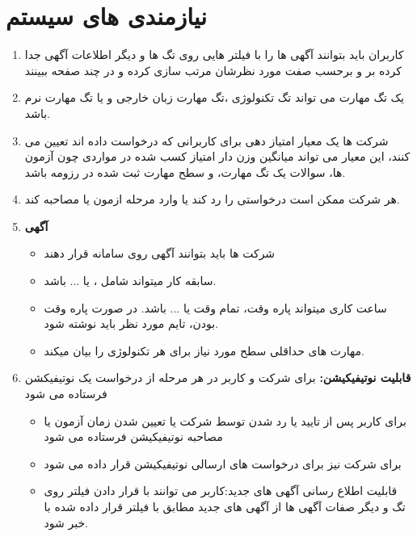 \documentclass{article}
\begin{document}
\section{نیازمندی های سیستم}
    \begin{enumerate}[\hspace{1cm}1.]
        \item کاربران باید بتوانند آگهی ها را با فیلتر هایی روی تگ ها و دیگر اطلاعات آگهی جدا کرده بر و برحسب صفت مورد نظرشان مرتب سازی کرده و در چند صفحه ببینند
        \item یک تگ مهارت می تواند تگ تکنولوژی ،تگ مهارت زبان خارجی و یا تگ مهارت نرم باشد.
        \item شرکت ها یک معیار امتیاز دهی برای کاربرانی که درخواست داده اند تعیین می کنند،
        این معیار می تواند میانگین وزن دار امتیاز کسب شده در مواردی چون آزمون ها، سوالات یک تگ مهارت، و سطح مهارت ثبت شده در رزومه باشد.
        \item هر شرکت ممکن است درخواستی را رد کند یا وارد مرحله ازمون یا مصاحبه کند.
        
        \item \textbf{آگهی}
        \begin{itemize}
            \item شرکت ها باید بتوانند آگهی روی سامانه قرار دهند 
            \item سابقه کار میتواند شامل ،  یا ... باشد.
            \item ساعت کاری میتواند پاره وقت، تمام وقت یا ... باشد. در صورت پاره وقت بودن، تایم مورد نظر باید نوشته شود.
            \item مهارت های حداقلی سطح مورد نیاز برای هر تکنولوژی را بیان میکند.
        \end{itemize}

        \item \textbf{ قابلیت نوتیفیکیشن:} برای شرکت و کاربر در هر مرحله از درخواست یک نوتیفیکشن فرستاده می شود
        \begin{itemize}
            \item برای کاربر پس از تایید یا رد شدن توسط شرکت یا تعیین شدن زمان آزمون یا مصاحبه نوتیفیکیشن فرستاده می شود
            \item برای شرکت نیز برای درخواست های ارسالی نوتیفیکیشن قرار داده می شود
            \item قابلیت اطلاع رسانی آگهی های جدید:کاربر می توانند با قرار دادن فیلتر روی تگ و دیگر صفات آگهی ها
            از آگهی های جدید مطابق با فیلتر قرار داده شده با خبر شود.
        \end{itemize}


\end{enumerate}
\end{document}
